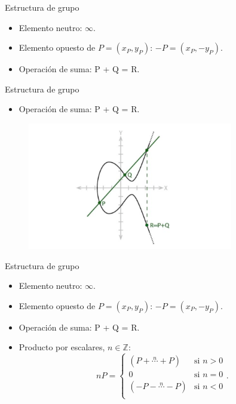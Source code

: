 \documentclass[12pt]{beamer}
\begin{document}
\begin{frame}[fragile]{Estructura de grupo}
  \begin{itemize}
  \item Elemento neutro: $\infty$.
  \item Elemento opuesto de $ P = (x_P, y_P) $: $-P = (x_P, -y_P) $.
  \item Operación de suma: P + Q = R.
  \end{itemize}
\end{frame}

\begin{frame}[fragile]{Estructura de grupo}
  \begin{itemize}
  \item Operación de suma: P + Q = R.
  \end{itemize}
    \begin{figure}[H]
	\centering
	\includegraphics[width=0.8\textwidth]{ec_add}
	\label{fig:EC_add}
\end{figure}
\end{frame}

\begin{frame}[fragile]{Estructura de grupo}
  \begin{itemize}
  \item Elemento neutro: $\infty$.
  \item Elemento opuesto de $ P = (x_P, y_P) $: $-P = (x_P, -y_P) $.
  \item Operación de suma: P + Q = R.
  \item Producto por escalares, $n \in \mathbb{Z}$: \[   
nP = 
\begin{cases}
 (P+\stackrel{n}{\cdots}+P) &\text{si } n > 0\\
0 &\text{si } n = 0\\
(-P-\stackrel{n}{\cdots}-P) &\text{si } n < 0\\
\end{cases}.
\]
  \end{itemize}
\end{frame}
\end{document}
